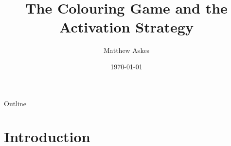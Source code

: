 \documentclass[handout]{beamer}
\title[The Colouring Game and the Activ. Strat.]{The Colouring Game and the Activation Strategy}
\author{Matthew Askes}
\institute[Victoria University]{Victoria University of Wellington}
\date{\today}
\begin{document}
\frame{\titlepage}


\begin{frame}{Outline}
    \tableofcontents
\end{frame}

\section{Introduction}


%      
%             
%            
%    
\end{document}
